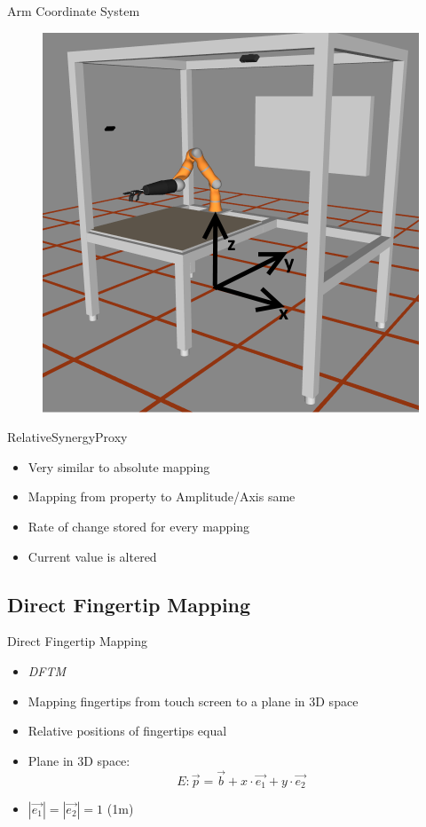 \documentclass[t]{beamer}
\begin{document}
\begin{frame}{Arm Coordinate System}
\begin{figure}
	\includegraphics[height=0.8\textheight]{assets/chpt_concepts/coordinates}
\end{figure}
\end{frame}

\begin{frame}{RelativeSynergyProxy}
\begin{itemize}
	\item Very similar to absolute mapping
	\item Mapping from property to Amplitude/Axis same
	\item Rate of change stored for every mapping
	\item Current value is altered
\end{itemize}
\end{frame}

\subsection{Direct Fingertip Mapping}

\begin{frame}{Direct Fingertip Mapping}
\begin{itemize}
	\item \textit{DFTM}
	\item Mapping fingertips from touch screen to a plane in 3D space
	\item Relative positions of fingertips equal
	\item Plane in 3D space:
	\begin{equation}
	E:\vec{p} = \vec{b} + x \cdot \vec{e_1} + y \cdot \vec{e_2}
	\end{equation}
	\item $|\vec{e_1}| = |\vec{e_2}| = 1$ (1m)
\end{itemize}
\end{frame}
\end{document}
